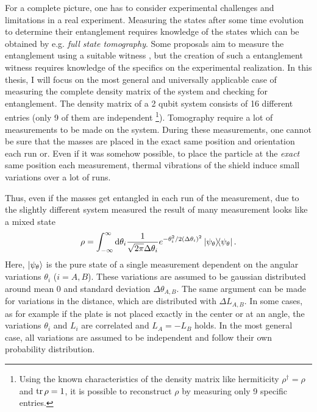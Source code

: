 For a complete picture, one has to consider experimental challenges and limitations in a real experiment. 
Measuring the states after some time evolution to determine their entanglement requires knowledge of the states which can be obtained by e.g. \emph{full state tomography}. Some proposals aim to measure the entanglement using a suitable witness \cite{Bose_2017,Chevalier_2020}, but the creation of such a entanglement witness requires knowledge of the specifics on the experimental realization.
In this thesis, I will focus on the most general and universally applicable case of measuring the complete density matrix of the system and checking for entanglement.
The density matrix of a 2 qubit system consists of 16 different entries (only 9 of them are independent \footnote{Using the known characteristics of the density matrix like hermiticity $\rho^\dagger = \rho$ and $\tr \rho = 1$, it is possible to reconstruct $\rho$ by measuring only 9 specific entries.}).
Tomography require a lot of measurements to be made on the system.
During these measurements, one cannot be sure that the masses are placed in the exact same position and orientation each run or.
Even if it was somehow possible, to place the particle at the \textit{exact} same position each measurement, thermal vibrations of the shield induce small variations over a lot of runs.

Thus, even if the masses get entangled in each run of the measurement, due to the slightly different system measured the result of many measurement looks like a mixed state
\begin{equation}
  \rho = \int_{-\infty}^{\infty} \dd \theta_i \frac{1}{\sqrt{2\pi}\Delta \theta_i} e^{-\theta_i^2/2(\Delta \theta_i)^2} \ketbra{\psi_\theta} .
\end{equation}
Here, $\ket{\psi_\theta}$ is the pure state of a single measurement dependent on the angular variations $\theta_i$ ($i=A,B$). These variations are assumed to be gaussian distributed around mean $0$ and standard deviation $\Delta \theta_{A,B}$.
The same argument can be made for variations in the distance, which are distributed with $\Delta L_{A,B}$.
In some cases, as for example if the plate is not placed exactly in the center or at an angle, the variations $\theta_i$ and $L_i$ are correlated and $L_A = -L_B$ holds.
In the most general case, all variations are assumed to be independent and follow their own probability distribution.









